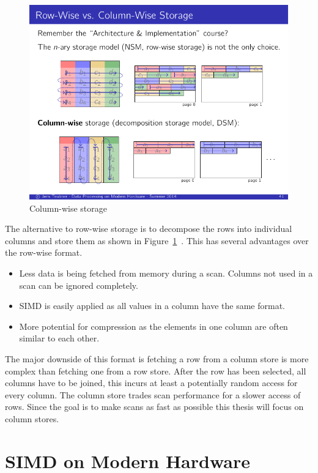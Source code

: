 \begin{figure}[h] \begin{center}
\includegraphics[scale=1.25]{images/colstore}
\end{center}
\caption{Column-wise storage~\cite{JensDPMH}}
\label{fig:colstore}
\end{figure}

The alternative to row-wise storage is to decompose the rows into individual
columns and store them as shown in Figure~\ref{fig:colstore}~\cite{copeland}.
This has several advantages over the row-wise format.

\begin{itemize}
  \item Less data is being fetched from memory during a scan. Columns not used
    in a scan can be ignored completely.
  \item SIMD is easily applied as all values in a column have the same format.
  \item More potential for compression as the elements in one column are often
    similar to each other.
\end{itemize}

The major downside of this format is fetching a row from a column store is more
complex than fetching one from a row store. After the row has been selected, all
columns have to be joined, this incurs at least a potentially random access for
every column. The column store trades scan performance for a slower access of
rows. Since the goal is to make scans as fast as possible this thesis will focus
on column stores.

\section{SIMD on Modern Hardware}

